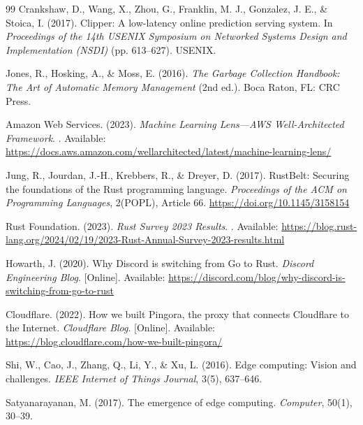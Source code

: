 \documentclass[10pt,twocolumn,a4paper]{article}
\theoremstyle{definition}
\theoremstyle{plain}
\begin{document}
\begin{thebibliography}{99}
Crankshaw, D., Wang, X., Zhou, G., Franklin, M. J., Gonzalez, J. E., \& Stoica, I. (2017).
\newblock Clipper: A low-latency online prediction serving system.
\newblock In \textit{Proceedings of the 14th USENIX Symposium on Networked Systems Design and Implementation (NSDI)} (pp. 613--627). USENIX.

Jones, R., Hosking, A., \& Moss, E. (2016).
\newblock \textit{The Garbage Collection Handbook: The Art of Automatic Memory Management} (2nd ed.).
\newblock Boca Raton, FL: CRC Press.

Amazon Web Services. (2023).
\newblock \textit{Machine Learning Lens---AWS Well-Architected Framework}.
\newblock [Online]. Available: \url{https://docs.aws.amazon.com/wellarchitected/latest/machine-learning-lens/}

Jung, R., Jourdan, J.-H., Krebbers, R., \& Dreyer, D. (2017).
\newblock RustBelt: Securing the foundations of the Rust programming language.
\newblock \textit{Proceedings of the ACM on Programming Languages}, 2(POPL), Article 66. \url{https://doi.org/10.1145/3158154}

Rust Foundation. (2023).
\newblock \textit{Rust Survey 2023 Results}.
\newblock [Online]. Available: \url{https://blog.rust-lang.org/2024/02/19/2023-Rust-Annual-Survey-2023-results.html}

Howarth, J. (2020).
\newblock Why Discord is switching from Go to Rust.
\newblock \textit{Discord Engineering Blog}. [Online]. Available: \url{https://discord.com/blog/why-discord-is-switching-from-go-to-rust}

Cloudflare. (2022).
\newblock How we built Pingora, the proxy that connects Cloudflare to the Internet.
\newblock \textit{Cloudflare Blog}. [Online]. Available: \url{https://blog.cloudflare.com/how-we-built-pingora/}

Shi, W., Cao, J., Zhang, Q., Li, Y., \& Xu, L. (2016).
\newblock Edge computing: Vision and challenges.
\newblock \textit{IEEE Internet of Things Journal}, 3(5), 637--646.

Satyanarayanan, M. (2017).
\newblock The emergence of edge computing.
\newblock \textit{Computer}, 50(1), 30--39.


\end{thebibliography}
\end{document}
